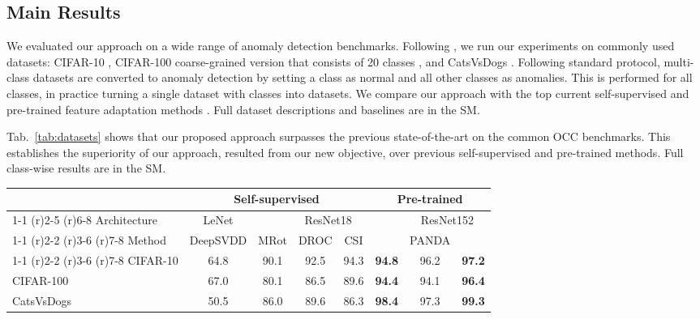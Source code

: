 \documentclass[letterpaper]{article} \usepackage{aaai23}  \usepackage{times}  \usepackage{helvet}  \usepackage{courier}  \usepackage[hyphens]{url}  \usepackage{graphicx} \usepackage{amsmath, amssymb}
\begin{document}
\subsection{Main Results}
\label{exp:main}
We evaluated our approach on a wide range of anomaly detection benchmarks. Following \cite{golan2018deep,hendrycks2019using}, we run our experiments on commonly used datasets:  CIFAR-10 \cite{krizhevsky2009learning}, CIFAR-100 coarse-grained version that consists of 20 classes \cite{krizhevsky2009learning}, and CatsVsDogs \cite{elson2007asirra}. Following standard protocol, multi-class datasets are converted to anomaly detection by setting a class as normal and all other classes as anomalies. This is performed for all classes, in practice turning a single dataset with  classes into  datasets. We compare our approach with the top current self-supervised and pre-trained feature adaptation methods \cite{ruff2018deep,hendrycks2019using,tack2020csi,sohn2020learning,reiss2021panda}. Full dataset descriptions and baselines are in the SM.

Tab.~\ref{tab:datasets} shows that our proposed approach surpasses the previous state-of-the-art on the common OCC benchmarks. This establishes the superiority of our approach, resulted from our new objective, over previous self-supervised and pre-trained methods. Full class-wise results are in the SM.

\begin{table*}[t]
  \centering
  \begin{tabular}{lccccccc}
    \toprule
	& \multicolumn{4}{c}{Self-supervised} 	&	\multicolumn{3}{c}{Pre-trained} 	\\
\cmidrule(r){1-1}
\cmidrule(r){2-5}
\cmidrule(r){6-8}
Architecture	&	LeNet 	& 	\multicolumn{4}{c}{ResNet18} & \multicolumn{2}{c}{ResNet152} \\
	

	\cmidrule(r){1-1}
    \cmidrule(r){2-2}
    \cmidrule(r){3-6}    
    \cmidrule(r){7-8}
Method    	&	DeepSVDD 	&	MRot 	&	DROC     &   CSI &   & PANDA &  \\
    \cmidrule(r){1-1}
    \cmidrule(r){2-2}
    \cmidrule(r){3-6}    
    \cmidrule(r){7-8}
CIFAR-10
	&	64.8	&	90.1	&	92.5	&	94.3	&	\textbf{94.8}  & 96.2 &   \textbf{97.2}\\
CIFAR-100
	&	67.0	&	80.1	&	86.5	&	89.6	&	\textbf{94.4}  & 94.1 &   \textbf{96.4}	\\
CatsVsDogs	&	50.5	&	86.0	&	89.6	&	86.3	&	\textbf{98.4}    & 97.3 & \textbf{99.3}    \\
    \bottomrule
  \end{tabular}
\caption{Anomaly detection performance (mean ROC-AUC\%). Best in bold.}
\label{tab:datasets}
\end{table*}
\end{document}
